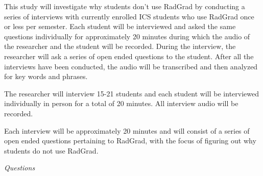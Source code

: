 \documentclass[english]{proposalnsf}
\begin{document}
This study will investigate why students don't use RadGrad by conducting a series of interviews with currently enrolled ICS students who use RadGrad once or less per semester. Each student will be interviewed and asked the same questions individually for approximately 20 minutes during which the audio of the researcher and the student will be recorded. During the interview, the researcher will ask a series of open ended questions to the student. After all the interviews have been conducted, the audio will be transcribed and then analyzed for key words and phrases.

The researcher will interview 15-21 students and each student will be interviewed individually in person for a total of 20 minutes. All interview audio will be recorded. 
 
Each interview will be approximately 20 minutes and will consist of a series of open ended questions pertaining to RadGrad, with the focus of figuring out why students do not use RadGrad.

{\em Questions}
\end{document}
